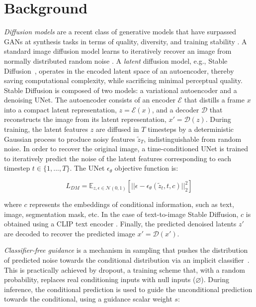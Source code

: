\section{Background}
    \textit{Diffusion models} are a recent class of generative models that have surpassed GANs at synthesis tasks in terms of quality, diversity, and training stability \cite{dms_beat_gans}. A standard image diffusion model learns to iteratively recover an image from normally distributed random noise \cite{diffusion_models}. A \textit{latent} diffusion model, e.g., Stable Diffusion~\cite{stable_diffusion}, operates in the encoded latent space of an autoencoder, thereby saving computational complexity, while sacrificing minimal perceptual quality.
    Stable Diffusion is composed of two models: a variational autoencoder and a denoising UNet. The autoencoder consists of an encoder $\mathcal{E}$ that distills a frame $x$ into a compact latent representation, $z = \mathcal{E}(x)$, and a decoder $\mathcal{D}$ that reconstructs the image from its latent representation, $x' = \mathcal{D}(z)$. 
    During training, the latent features $z$ are diffused in $T$ timesteps by a deterministic Gaussian process to produce noisy features $\tilde{z}_T$, indistinguishable from random noise. In order to recover the original image, a time-conditioned UNet is trained to iteratively predict the noise of the latent features corresponding to each timestep $t \in \{ 1, ..., T\}$. The UNet $\epsilon_{\theta}$ objective function is:

        \begin{equation}
            L_{DM} = \mathbb{E}_{z, \epsilon \in  \mathcal{N}(0,1)} [ || \epsilon - \epsilon_{\theta}(\tilde{z}_t, t, c)||^2_2 ]
        \end{equation}

    \noindent where $c$ represents the embeddings of conditional information, such as text, image, segmentation mask, etc. In the case of text-to-image Stable Diffusion, $c$ is obtained using a CLIP text encoder \cite{clip}.
    Finally, the predicted denoised latents $z'$ are decoded to recover the predicted image $x' = \mathcal{D}(x')$.

    \textit{Classifier-free guidance} is a mechanism in sampling that pushes the distribution of predicted noise towards the conditional distribution via an implicit classifier~\cite{classifier_free_guidance}. This is practically achieved by dropout, a training scheme that, with a random probability, replaces real conditioning inputs with null inputs ($\varnothing$). During inference, the conditional prediction is used to guide the unconditional prediction towards the conditional, using a guidance scalar weight $s$:

